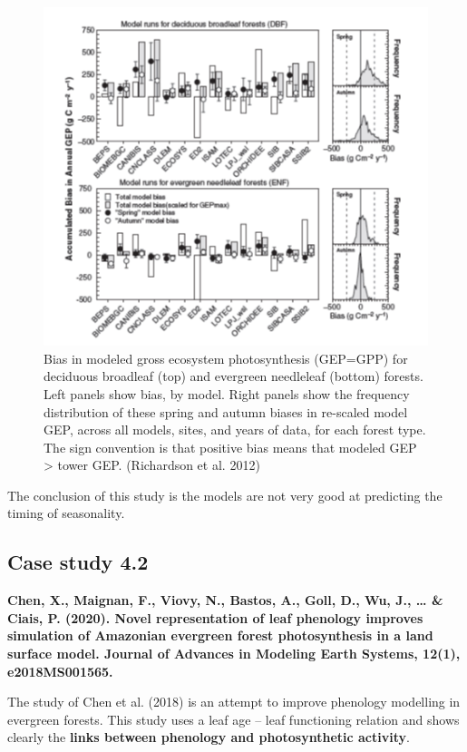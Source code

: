 \documentclass[12pt,oneside]{book}
\begin{document}
\begin{figure}

{\centering \includegraphics[width=0.8\linewidth]{figures/chap4/f48_bias_richardson} 

}

\caption{Bias in modeled gross ecosystem photosynthesis (GEP=GPP) for deciduous broadleaf (top) and evergreen needleleaf (bottom) forests. Left panels show bias, by model. Right panels show the frequency distribution of these spring and autumn biases in re-scaled model GEP, across all models, sites, and years of data, for each forest type. The sign convention is that positive bias means that modeled GEP > tower GEP. (Richardson et al. 2012)}\label{fig:f410}
\end{figure}

The conclusion of this study is the models are not very good at
predicting the timing of seasonality.

\subsection{Case study 4.2}\label{case-study-4.2}

\textbf{Chen, X., Maignan, F., Viovy, N., Bastos, A., Goll, D., Wu, J.,
\ldots{} \& Ciais, P. (2020). Novel representation of leaf phenology
improves simulation of Amazonian evergreen forest photosynthesis in a
land surface model. Journal of Advances in Modeling Earth Systems,
12(1), e2018MS001565.}

The study of Chen et al. (2018) is an attempt to improve phenology
modelling in evergreen forests. This study uses a leaf age -- leaf
functioning relation and shows clearly the \textbf{links between
phenology and photosynthetic activity}.
\end{document}
